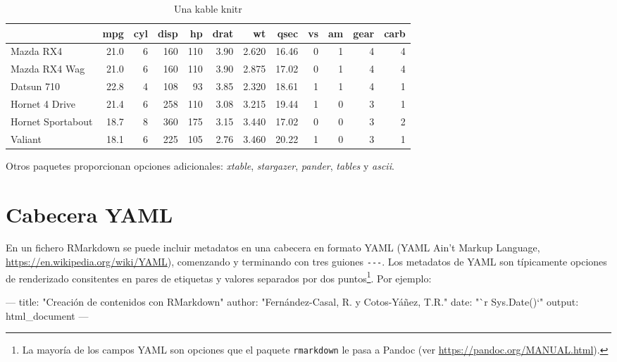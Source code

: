 \documentclass[]{book}
\newenvironment{Shaded}{\begin{snugshade}}{\end{snugshade}}
\newcommand{\StringTok}[1]{\textcolor[rgb]{0.31,0.60,0.02}{#1}}
\newcommand{\OtherTok}[1]{\textcolor[rgb]{0.56,0.35,0.01}{#1}}
\newcommand{\FunctionTok}[1]{\textcolor[rgb]{0.00,0.00,0.00}{#1}}
\newcommand{\AttributeTok}[1]{\textcolor[rgb]{0.77,0.63,0.00}{#1}}
\let\rmarkdownfootnote\footnote%
\def\footnote{\protect\rmarkdownfootnote}
\theoremstyle{definition}
\theoremstyle{definition}
\theoremstyle{definition}
\theoremstyle{remark}
\begin{document}
\begin{table}

\caption{\label{tab:kable}Una kable knitr}
\centering
\begin{tabular}[t]{l|r|r|r|r|r|r|r|r|r|r|r}
\hline
  & mpg & cyl & disp & hp & drat & wt & qsec & vs & am & gear & carb\\
\hline
Mazda RX4 & 21.0 & 6 & 160 & 110 & 3.90 & 2.620 & 16.46 & 0 & 1 & 4 & 4\\
\hline
Mazda RX4 Wag & 21.0 & 6 & 160 & 110 & 3.90 & 2.875 & 17.02 & 0 & 1 & 4 & 4\\
\hline
Datsun 710 & 22.8 & 4 & 108 & 93 & 3.85 & 2.320 & 18.61 & 1 & 1 & 4 & 1\\
\hline
Hornet 4 Drive & 21.4 & 6 & 258 & 110 & 3.08 & 3.215 & 19.44 & 1 & 0 & 3 & 1\\
\hline
Hornet Sportabout & 18.7 & 8 & 360 & 175 & 3.15 & 3.440 & 17.02 & 0 & 0 & 3 & 2\\
\hline
Valiant & 18.1 & 6 & 225 & 105 & 2.76 & 3.460 & 20.22 & 1 & 0 & 3 & 1\\
\hline
\end{tabular}
\end{table}

Otros paquetes proporcionan opciones adicionales: \emph{xtable},
\emph{stargazer}, \emph{pander}, \emph{tables} y \emph{ascii}.

\section{Cabecera YAML}\label{yaml}

En un fichero RMarkdown se puede incluir metadatos en una cabecera en
formato YAML (YAML Ain't Markup Language,
\url{https://en.wikipedia.org/wiki/YAML}), comenzando y terminando con
tres guiones \texttt{-\/-\/-}. Los metadatos de YAML son típicamente
opciones de renderizado consitentes en pares de etiquetas y valores
separados por dos puntos\footnote{La mayoría de los campos YAML son
  opciones que el paquete \texttt{rmarkdown} le pasa a Pandoc (ver
  \url{https://pandoc.org/MANUAL.html}).}. Por ejemplo:

\begin{Shaded}
\begin{Highlighting}[]
\OtherTok{---}
\FunctionTok{title:}\AttributeTok{ }\StringTok{"Creación de contenidos con RMarkdown"}
\FunctionTok{author:}\AttributeTok{ }\StringTok{"Fernández-Casal, R. y Cotos-Yáñez, T.R."}
\FunctionTok{date:}\AttributeTok{ }\StringTok{"`r Sys.Date()`"}
\FunctionTok{output:}\AttributeTok{ html_document}
\OtherTok{---}
\end{Highlighting}
\end{Shaded}
\end{document}
